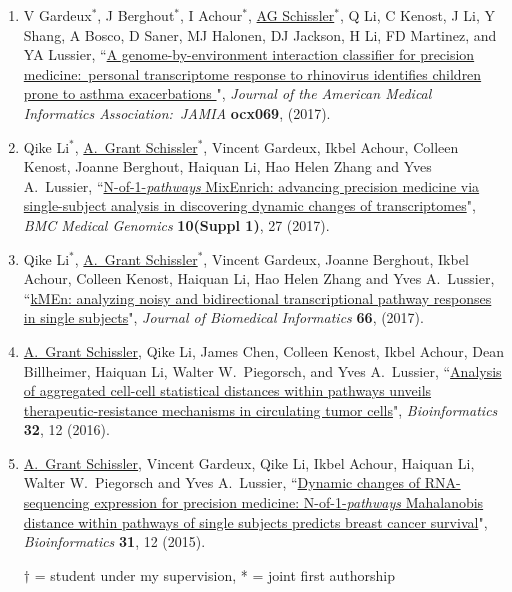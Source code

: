 \documentclass[paper=a4,fontsize=11pt]{scrartcl} %
\newcommand{\PaperEntry}[7]{
		\noindent #1, ``\href{#7}{#2}", \textit{#3} \textbf{#4}, #5 (#6).}
\begin{document}
\begin{enumerate}
  \item \PaperEntry{V Gardeux$^{*}$, J Berghout$^{*}$, I Achour$^{*}$, \underline{AG Schissler}$^{*}$, Q Li, C Kenost, J Li, Y Shang, A Bosco, D Saner, MJ Halonen, DJ Jackson, H Li, FD Martinez, and YA Lussier}{A genome-by-environment interaction classifier for precision medicine:~personal transcriptome response to rhinovirus identifies children prone to asthma exacerbations
}{Journal of the American Medical Informatics Association:~JAMIA}{ocx069}{}{2017}{https://academic.oup.com/jamia/article-abstract/doi/10.1093/jamia/ocx069/4004728/A-genome-by-environment-interaction-classifier-for?redirectedFrom=fulltext}

\item \PaperEntry{Qike Li$^{*}$, \underline{A.~Grant Schissler$^{*}$}, Vincent Gardeux, Ikbel Achour, Colleen Kenost, Joanne Berghout, Haiquan Li, Hao Helen Zhang and Yves A.~Lussier}{N-of-1-\emph{pathways} MixEnrich: advancing precision medicine via single-subject analysis in discovering dynamic changes of transcriptomes}{BMC Medical Genomics}{10(Suppl 1)}{27}{2017}{https://bmcmedgenomics.biomedcentral.com/articles/10.1186/s12920-017-0263-4}

\item \PaperEntry{Qike Li$^{*}$, \underline{A.~Grant Schissler}$^{*}$, Vincent Gardeux, Joanne Berghout, Ikbel Achour, Colleen Kenost, Haiquan Li, Hao Helen Zhang and Yves A.~Lussier}{kMEn: analyzing noisy and bidirectional transcriptional pathway responses in single subjects}{Journal of Biomedical Informatics}{66}{}{2017}{http://www.sciencedirect.com/science/article/pii/S1532046416301836}

\item \PaperEntry{\underline{A.~Grant Schissler}, Qike Li, James Chen, Colleen Kenost, Ikbel Achour, Dean Billheimer, Haiquan Li, Walter W.~Piegorsch, and Yves A.~Lussier}{Analysis of aggregated cell-cell statistical distances within pathways unveils therapeutic-resistance mechanisms in circulating tumor cells}{Bioinformatics}{32}{12}{2016}{http://bioinformatics.oxfordjournals.org/content/32/12/i80.full}

\item \PaperEntry{\underline{A.~Grant Schissler}, Vincent Gardeux, Qike Li, Ikbel Achour, Haiquan Li, Walter W.~Piegorsch and Yves A.~Lussier}{Dynamic changes of RNA-sequencing expression for precision medicine: N-of-1-\textit{pathways} Mahalanobis distance within pathways of single subjects predicts breast cancer survival}{Bioinformatics}{31}{12}{2015}{http://bioinformatics.oxfordjournals.org/content/31/12/i293.full}

  $\dagger$ = student under my supervision, * = joint first authorship
\end{enumerate}
\end{document}
